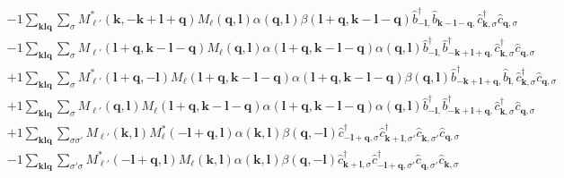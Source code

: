 \begin{align*}
	&-1 \sum_{ \mathbf{k} \mathbf{l} \mathbf{q} } \sum_{ \sigma } M_{\ell'}^*( \mathbf{k}, -\mathbf{k}+\mathbf{l}+\mathbf{q} )  M_{\ell}( \mathbf{q}, \mathbf{l} )  \alpha( \mathbf{q}, \mathbf{l} )  \beta( \mathbf{l}+\mathbf{q}, \mathbf{k}-\mathbf{l}-\mathbf{q} )   \hat{b}_{ -\mathbf{l}, }^\dagger  \hat{b}_{ \mathbf{k}-\mathbf{l}-\mathbf{q}, }^{\phantom{\dagger}} \hat{c}_{ \mathbf{k}, \sigma }^\dagger  \hat{c}_{ \mathbf{q}, \sigma }^{\phantom{\dagger}}  \\
	&-1 \sum_{ \mathbf{k} \mathbf{l} \mathbf{q} } \sum_{ \sigma } M_{\ell'}( \mathbf{l}+\mathbf{q}, \mathbf{k}-\mathbf{l}-\mathbf{q} )  M_{\ell}( \mathbf{q}, \mathbf{l} )  \alpha( \mathbf{l}+\mathbf{q}, \mathbf{k}-\mathbf{l}-\mathbf{q} )  \alpha( \mathbf{q}, \mathbf{l} )   \hat{b}_{ -\mathbf{l}, }^\dagger  \hat{b}_{ -\mathbf{k}+\mathbf{l}+\mathbf{q}, }^\dagger  \hat{c}_{ \mathbf{k}, \sigma }^\dagger  \hat{c}_{ \mathbf{q}, \sigma }^{\phantom{\dagger}}  \\
	&+1 \sum_{ \mathbf{k} \mathbf{l} \mathbf{q} } \sum_{ \sigma } M_{\ell'}^*( \mathbf{l}+\mathbf{q}, -\mathbf{l} )  M_{\ell}( \mathbf{l}+\mathbf{q}, \mathbf{k}-\mathbf{l}-\mathbf{q} )  \alpha( \mathbf{l}+\mathbf{q}, \mathbf{k}-\mathbf{l}-\mathbf{q} )  \beta( \mathbf{q}, \mathbf{l} )   \hat{b}_{ -\mathbf{k}+\mathbf{l}+\mathbf{q}, }^\dagger  \hat{b}_{ \mathbf{l}, }^{\phantom{\dagger}} \hat{c}_{ \mathbf{k}, \sigma }^\dagger  \hat{c}_{ \mathbf{q}, \sigma }^{\phantom{\dagger}}  \\
	&+1 \sum_{ \mathbf{k} \mathbf{l} \mathbf{q} } \sum_{ \sigma } M_{\ell'}( \mathbf{q}, \mathbf{l} )  M_{\ell}( \mathbf{l}+\mathbf{q}, \mathbf{k}-\mathbf{l}-\mathbf{q} )  \alpha( \mathbf{l}+\mathbf{q}, \mathbf{k}-\mathbf{l}-\mathbf{q} )  \alpha( \mathbf{q}, \mathbf{l} )   \hat{b}_{ -\mathbf{l}, }^\dagger  \hat{b}_{ -\mathbf{k}+\mathbf{l}+\mathbf{q}, }^\dagger  \hat{c}_{ \mathbf{k}, \sigma }^\dagger  \hat{c}_{ \mathbf{q}, \sigma }^{\phantom{\dagger}}  \\
	&+1 \sum_{ \mathbf{k} \mathbf{l} \mathbf{q} } \sum_{ \sigma \sigma' } M_{\ell'}( \mathbf{k}, \mathbf{l} )  M_{\ell}^*( -\mathbf{l}+\mathbf{q}, \mathbf{l} )  \alpha( \mathbf{k}, \mathbf{l} )  \beta( \mathbf{q}, -\mathbf{l} )   \hat{c}_{ -\mathbf{l}+\mathbf{q}, \sigma }^\dagger  \hat{c}_{ \mathbf{k}+\mathbf{l}, \sigma' }^\dagger  \hat{c}_{ \mathbf{k}, \sigma' }^{\phantom{\dagger}} \hat{c}_{ \mathbf{q}, \sigma }^{\phantom{\dagger}}  \\
	&-1 \sum_{ \mathbf{k} \mathbf{l} \mathbf{q} } \sum_{ \sigma' \sigma } M_{\ell'}^*( -\mathbf{l}+\mathbf{q}, \mathbf{l} )  M_{\ell}( \mathbf{k}, \mathbf{l} )  \alpha( \mathbf{k}, \mathbf{l} )  \beta( \mathbf{q}, -\mathbf{l} )   \hat{c}_{ \mathbf{k}+\mathbf{l}, \sigma }^\dagger  \hat{c}_{ -\mathbf{l}+\mathbf{q}, \sigma' }^\dagger  \hat{c}_{ \mathbf{q}, \sigma' }^{\phantom{\dagger}} \hat{c}_{ \mathbf{k}, \sigma }^{\phantom{\dagger}}  \\

\end{align*}
